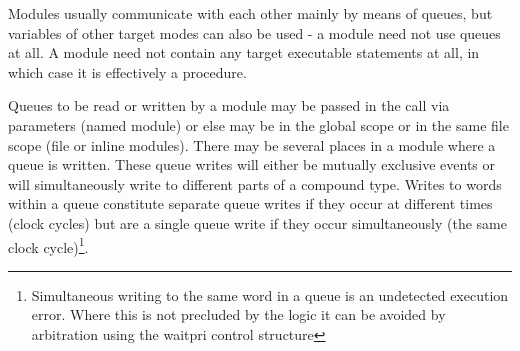         Modules usually communicate with each other mainly by means of queues,
        but variables of other target modes can also be used - a module
        need not use queues at all. A module need not contain any target
        executable statements at all, in which case it is effectively a procedure.

        Queues to be read or written by a module may be passed in the call via
        parameters (named module) or else may be in the global scope or in the
        same file scope (file or inline modules). There may be several places in
        a module where a queue is written. These queue writes will either be
        mutually exclusive events or will simultaneously write to different
        parts of a compound type. Writes to words within a queue constitute
        separate queue writes if they occur at different times (clock cycles)
        but are a single queue write if they occur simultaneously (the same
        clock cycle)\footnote{Simultaneous writing to the same word in a queue
        is an undetected execution error. Where this is not precluded by the
        logic it can be avoided by arbitration using the waitpri control
        structure }.


